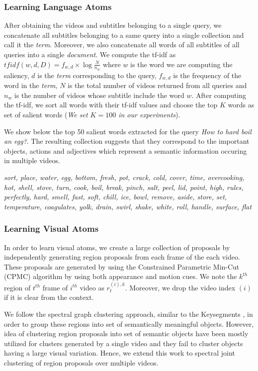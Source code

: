 \subsubsection{Learning Language Atoms}
After obtaining the videos and subtitles belonging to a single query, we concatenate all subtitles belonging to a same query into a single collection and call it the \emph{term}. Moreover, we also concatenate all words of all subtitles of all queries into a single \emph{document}. We compute the tf-idf as $tfidf(w,d,D)=f_{w,d} \times \log \frac{N}{n_{w}}$ where $w$ is the word we are computing the saliency, $d$ is the \emph{term} corresponding to the query, $f_{w,d}$ is the frequency of the word in the \emph{term}, $N$ is the total number of videos returned from all queries and $n_{w}$ is the number of videos whose subtitle include the word $w$. After computing the tf-idf, we sort all words with their tf-idf values and choose the top $K$ words as set of salient words (\emph{We set $K=100$ in our experiments}).

We show below the top 50 salient words extracted for the query \emph{How to hard boil an egg?}. The resulting collection suggests that they correspond to the important objects, actions and adjectives which represent a semantic information occuring in multiple videos.

\footnotesize
\emph{sort, place, water, egg, bottom, fresh, pot, crack, cold, cover, time, overcooking, hot, shell, stove, turn, cook, boil, break, pinch, salt, peel, lid, point, high, rules, perfectly, hard, smell, fast, soft, chill, ice, bowl, remove, aside, store, set, temperature, coagulates, yolk, drain, swirl, shake, white, roll, handle, surface, flat}
\normalsize


\subsubsection{Learning Visual Atoms}
In order to learn visual atoms, we create a large collection of proposals by independently generating region proposals from each frame of the each video. These proposals are generated by using the Constrained Parametric Min-Cut (CPMC) \cite{cpmc} algorithm by using both appearance and motion cues. We note the $k^{th}$ region of $t^{th}$ frame of $i^{th}$ video as $r^{(i),k}_t$. Moreover, we drop the video index $(i)$ if it is clear from the context.

We follow the spectral graph clustering approach, similar to the Keysegments \cite{keysegments}, in order to group these regions into set of semantically meaningful objects. However, idea of clustering region proposals into set of semantic objects have been mostly utilized for clusters generated by a single video and they fail to cluster objects having a large visual variation. Hence, we extend this work to spectral joint clustering of region proposals over multiple videos.

